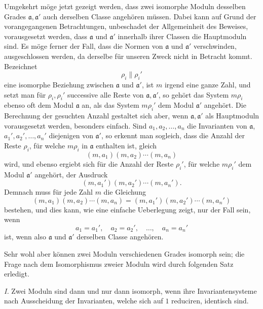 \documentclass[11pt,a4paper]{article}
\begin{document}
Umgekehrt möge jetzt gezeigt werden, dass zwei isomorphe Moduln desselben Grades $\mathfrak a,\mathfrak a'$ auch derselben Classe angehören müssen. Dabei kann auf Grund der vorangegangenen Betrachtungen, unbeschadet der Allgemeinheit des Beweises, vorausgesetzt werden, dass $\mathfrak a$ und $\mathfrak a'$ innerhalb ihrer Classen die Hauptmoduln sind. Es möge ferner der Fall, dass die Normen von $\mathfrak a$ und $\mathfrak a'$ verschwinden, ausgeschlossen werden, da derselbe für unseren Zweck nicht in Betracht kommt. Bezeichnet
\[
 \rho_i\parallel \rho_i'
\]
eine isomorphe Beziehung zwischen $\mathfrak a$ und $\mathfrak a'$, ist $m$ irgend eine ganze Zahl, und setzt man für $\rho_i,\rho_i'$ successive alle Reste von $\mathfrak a,\mathfrak a'$, so gehört das System $m\rho_i$ ebenso oft dem Modul $\mathfrak a$ an, als das System $m\rho_i'$ dem Modul $\mathfrak a'$ angehört. Die Berechnung der gesuchten Anzahl gestaltet sich aber, wenn $\mathfrak a,\mathfrak a'$ als Hauptmoduln vorausgesetzt werden, besonders einfach. Sind $a_1,a_2,\ldots,a_n$ die Invarianten von $\mathfrak a$, $a_1',a_2',\ldots,a_n'$ diejenigen von $\mathfrak a'$, so erkennt man sogleich, dass die Anzahl der Reste $\rho_i$, für welche $m\rho_i$ in $\mathfrak a$ enthalten ist, gleich
\[
 (m,a_1)(m,a_2)\cdots(m,a_n)
\]
wird, und ebenso ergiebt sich für die Anzahl der Reste $\rho_i'$, für welche $m\rho_i'$ dem Modul $\mathfrak a'$ angehört, der Ausdruck
\[
 (m,a_1')(m,a_2')\cdots(m,a_n').
\]
Demnach muss für jede Zahl $m$ die Gleichung
\[
 (m,a_1)(m,a_2)\cdots(m,a_n)=(m,a_1')(m,a_2')\cdots(m,a_n')
\]
bestehen, und dies kann, wie eine einfache Ueberlegung zeigt, nur der Fall sein, wenn
\[
 a_1=a_1',\quad a_2=a_2',\quad\ldots,\quad a_n=a_n'
\]
ist, wenn also $\mathfrak a$ und $\mathfrak a'$ derselben Classe angehören.

Sehr wohl aber können zwei Moduln verschiedenen Grades isomorph sein; die Frage nach dem Isomorphismus zweier Moduln wird durch folgenden Satz erledigt.

\emph{I.} Zwei Moduln sind dann und nur dann isomorph, wenn ihre Invariantensysteme nach Ausscheidung der Invarianten, welche sich auf $1$ reduciren, identisch sind.
\end{document}

